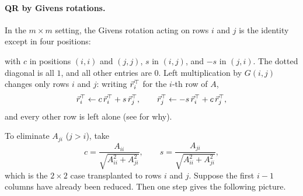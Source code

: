 \paragraph{QR by Givens rotations.} In the $m \times m$ setting, the Givens rotation acting on rows $i$ and $j$ is the identity except in four positions:
\begin{center}
\end{center}
with $c$ in positions $(i, i)$ and $(j, j)$, $s$ in $(i, j)$, and $-s$ in $(j, i)$. The dotted diagonal is all $1$, and all other entries are $0$. Left multiplication by $G(i, j)$ changes only rows $i$ and $j$: writing $\vec{r}_i^\top$ for the $i$-th row of $A$,
\begin{equation}
  \vec{r}_i^\top \gets c\,\vec{r}_i^\top + s\,\vec{r}_j^\top, \qquad \vec{r}_j^\top \gets -s\,\vec{r}_i^\top + c\,\vec{r}_j^\top,
\end{equation}
and every other row is left alone (see  for why).

To eliminate $A_{ji}$ ($j > i$), take
\begin{equation}
  c = \frac{A_{ii}}{\sqrt{A_{ii}^2 + A_{ji}^2}}, \qquad s = \frac{A_{ji}}{\sqrt{A_{ii}^2 + A_{ji}^2}},
\end{equation}
which is the $2 \times 2$ case transplanted to rows $i$ and $j$. Suppose the first $i - 1$ columns have already been reduced. Then one step gives the following picture.

